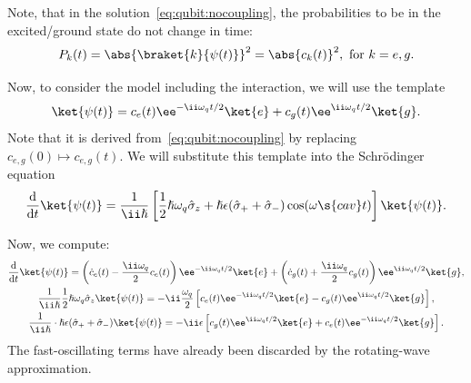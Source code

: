 \documentclass[fontsize=9pt,bookmarkpackage=false]{scrartcl}
\renewcommand{\hbar}{\hslash}
\begin{document}
Note, that in the solution~\eqref{eq:qubit:nocoupling}, the probabilities to be in the excited/ground state do not change in time:
\begin{equation}
  P_k (t) = \abs{ \braket{ k }{ \psi (t) } }^2 = \abs{ c_k (t) }^2,
  \text{ for } k = e,g.
\end{equation}

Now, to consider the model including the interaction, we will use the template
\begin{equation}
  \ket{ \psi (t) }
  =
  c_e (t) \ee^{ - \ii \omega_q t / 2 } \ket{ e }
  +
  c_g (t) \ee^{ \ii \omega_q t / 2 } \ket{ g }.
\end{equation}
Note that it is derived from~\cref{eq:qubit:nocoupling} by replacing $c_{e,g } (0) \mapsto c_{e,g } (t)$.
We will substitute this template into the Schrödinger equation
\begin{equation}
  \diff{}{ t} \ket{ \psi(t) }
  = \frac{ 1 }{ \ii \hbar }
  \left[
    \frac 12 \hbar \omega_q \hat \sigma_z
    +
    \hbar \epsilon ( \hat \sigma_+ + \hat \sigma_- )
    \cos ( \omega\s{cav} t )
  \right]
  \ket{ \psi (t) }.
\end{equation}

Now, we compute:
\begin{gather}
  \label{eq:rabi:lhs}
  \diff{}{ t } \ket{ \psi (t) }
  =
  \left( \dot c_e (t) - \frac{ \ii \omega_q  }{ 2 } c_e (t) \right) \ee^{ - \ii \omega_ q t / 2 } \ket{ e }
  +
  \left( \dot c_g (t) + \frac{\ii \omega_q}{2} c_g (t)\right) \ee^{ \ii \omega_ q t / 2 } \ket{ g },
  \\
  \label{eq:rabi:own}
  \frac{ 1 }{ \ii \hbar } \frac 12 \hbar \omega_q \hat \sigma_z \ket{ \psi (t) }
  = - \ii \frac{ \omega_ q }{ 2 }
  \left[
    c_e (t) \ee^ { - \ii \omega_q t / 2 }  \ket{ e }
    - c_g (t ) \ee^ { \ii \omega_q t / 2 } \ket { g }
  \right],
  \\
  \frac{ 1 }{ \ii \hbar } \cdot \hbar \epsilon ( \hat \sigma_+ + \hat \sigma_- )
  \ket{ \psi (t) }
  =
  - \ii \epsilon
  \left[
  c_g (t) \ee^{ \ii \omega_q t / 2 } \ket{ e }
  +
  c_e (t) \ee^{ - \ii \omega_q t / 2 } \ket{ g }
  \right].
\end{gather}
The fast-oscillating terms have already been discarded by the rotating-wave approximation.
\end{document}

